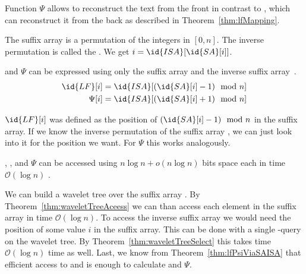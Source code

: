 Function $\Psi$ allows to reconstruct the text from the front in contrast to , which can reconstruct it from the back as described in Theorem~\ref{thm:lfMapping}.

\begin{Definition}
  The suffix array is a permutation of the integers in $[0,n]$. The inverse permutation  is called the . We get $i = \id{ISA}[\id{SA}[i]]$.
\end{Definition}

\begin{Theorem}
  \label{thm:lfPsiViaSAISA}
   and $\Psi$ can be expressed using only the suffix array  and the inverse suffix array~.
  \begin{align}
    \id{LF}[i] &= \id{ISA}[(\id{SA}[i] - 1) \mod n] \\
    \Psi[i] &= \id{ISA}[(\id{SA}[i] + 1) \mod n]
  \end{align}
\end{Theorem}

\begin{Proof}
  $\id{LF}[i]$ was defined as the position of $(\id{SA}[i] - 1) \mod n$ in the suffix array. If we know the inverse permutation of the suffix array , we can just look into it for the position we want. For $\Psi$ this works analogously.
\end{Proof}

\begin{Theorem}
  \label{thm:waveletTreeSAISALFPsi}
  , ,  and $\Psi$ can be accessed using $n \log n + o(n \log n)$ bits space each in time $\mathcal{O}(\log n)$ .
\end{Theorem}

\begin{Proof}
  We can build a wavelet tree over the suffix array . By Theorem~\ref{thm:waveletTreeAceess} we can than access each element in the suffix array in time $\mathcal{O}(\log n)$. To access the inverse suffix array  we would need the position of some value $i$ in the suffix array. This can be done with a single -query on the wavelet tree. By Theorem~\ref{thm:waveletTreeSelect} this takes time $\mathcal{O}(\log n)$ time as well. Last, we know from Theorem~\ref{thm:lfPsiViaSAISA} that efficient access to  and  is enough to calculate  and $\Psi$.
\end{Proof}

